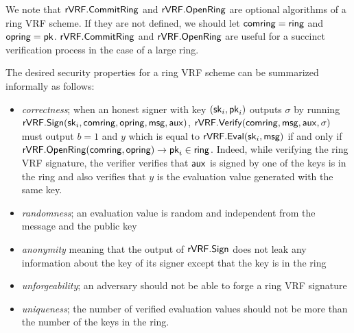 We note that $ {\mathsf{rVRF}}.{\mathsf{CommitRing}} $ and $  {\mathsf{rVRF}}.{\mathsf{OpenRing}} $ are optional algorithms of a ring VRF scheme. If they are not defined, we should let $ \mathsf{comring} = \mathsf{ring} $ and $ \mathsf{opring}  = \mathsf{pk}$. $ {\mathsf{rVRF}}.{\mathsf{CommitRing}} $ and $  {\mathsf{rVRF}}.{\mathsf{OpenRing}} $ are useful for a succinct verification process in the case of a large ring.

The desired security properties for a ring VRF scheme can be summarized informally as follows: 
\begin{itemize}
	\item \emph{correctness}; when an honest signer with key $ (\mathsf{sk}_i,\mathsf{pk}_i) $ outputs $ \sigma $ by running $ {\mathsf{rVRF}}.{\mathsf{Sign}}(\mathsf{sk}_i, \mathsf{comring},\mathsf{opring}, \mathsf{msg}, \mathsf{aux}) $, $ {\mathsf{rVRF}}.{\mathsf{Verify}}(\mathsf{comring},\mathsf{msg},\mathsf{aux},\sigma)  $ must output $ b =1 $ and $ y $ which is equal to $ {\mathsf{rVRF}}.{\mathsf{Eval}}(\mathsf{sk}_i, \mathsf{msg}) $ if and only if $ {\mathsf{rVRF}}.{\mathsf{OpenRing}}(\mathsf{comring},\mathsf{opring}) \rightarrow \mathsf{pk}_i \in \mathsf{ring}$. Indeed, while verifying the ring VRF signature, the verifier verifies that $ \mathsf{aux} $ is signed by one of the keys is in the ring and also verifies that  $ y $ is the evaluation value generated with the same key. 
	\item \emph{randomness}; an evaluation value is random and independent from the message and the public key
	\item   \emph{anonymity} meaning that the output of $ {\mathsf{rVRF}}.{\mathsf{Sign}} $ does not leak any information about the key of its signer except that the key is in the ring
	\item \emph{unforgeability}; an adversary should not be able to forge a ring VRF signature 
	\item  \emph{uniqueness}; the number of verified evaluation values should not be more than the number of the keys in the ring.
\end{itemize}






